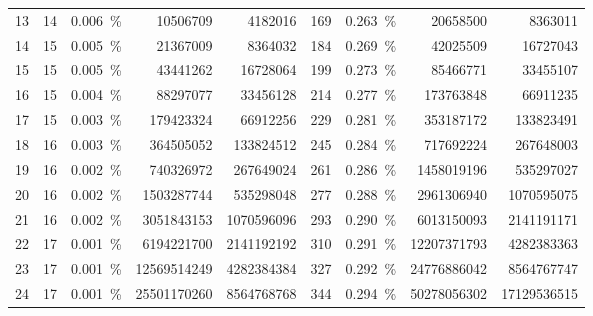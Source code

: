 \begin{tabular}{ r | c c r r | c c r r }
    \rowcolor[gray]{0.925}
    \num{13} & \num{14} & \SI{0.006}{\%} & \num{10506709} & \num{4182016} & \num{169} & \SI{0.263}{\%} & \num{20658500} & \num{8363011} \\
    \num{14} & \num{15} & \SI{0.005}{\%} & \num{21367009} & \num{8364032} & \num{184} & \SI{0.269}{\%} & \num{42025509} & \num{16727043} \\
    \rowcolor[gray]{0.925}
    \num{15} & \num{15} & \SI{0.005}{\%} & \num{43441262} & \num{16728064} & \num{199} & \SI{0.273}{\%} & \num{85466771} & \num{33455107} \\
    \num{16} & \num{15} & \SI{0.004}{\%} & \num{88297077} & \num{33456128} & \num{214} & \SI{0.277}{\%} & \num{173763848} & \num{66911235} \\
    \rowcolor[gray]{0.925}
    \num{17} & \num{15} & \SI{0.003}{\%} & \num{179423324} & \num{66912256} & \num{229} & \SI{0.281}{\%} & \num{353187172} & \num{133823491} \\
    \num{18} & \num{16} & \SI{0.003}{\%} & \num{364505052} & \num{133824512} & \num{245} & \SI{0.284}{\%} & \num{717692224} & \num{267648003} \\
    \rowcolor[gray]{0.925}
    \num{19} & \num{16} & \SI{0.002}{\%} & \num{740326972} & \num{267649024} & \num{261} & \SI{0.286}{\%} & \num{1458019196} & \num{535297027} \\
    \num{20} & \num{16} & \SI{0.002}{\%} & \num{1503287744} & \num{535298048} & \num{277} & \SI{0.288}{\%} & \num{2961306940} & \num{1070595075} \\
    \rowcolor[gray]{0.925}
    \num{21} & \num{16} & \SI{0.002}{\%} & \num{3051843153} & \num{1070596096} & \num{293} & \SI{0.290}{\%} & \num{6013150093} & \num{2141191171} \\
    \num{22} & \num{17} & \SI{0.001}{\%} & \num{6194221700} & \num{2141192192} & \num{310} & \SI{0.291}{\%} & \num{12207371793} & \num{4282383363} \\
    \rowcolor[gray]{0.925}
    \num{23} & \num{17} & \SI{0.001}{\%} & \num{12569514249} & \num{4282384384} & \num{327} & \SI{0.292}{\%} & \num{24776886042} & \num{8564767747} \\
    \num{24} & \num{17} & \SI{0.001}{\%} & \num{25501170260} & \num{8564768768} & \num{344} & \SI{0.294}{\%} & \num{50278056302} & \num{17129536515} \\
    \hline
\end{tabular}%
